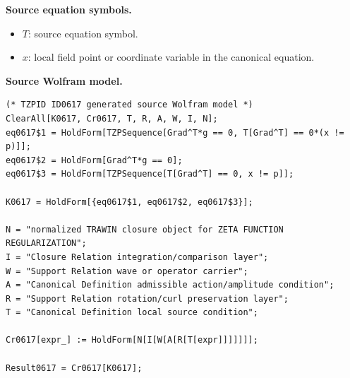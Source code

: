 \begin{minipage}[t]{0.49\linewidth}
\begingroup
\small
\raggedright
\textbf{Source equation symbols.}\par
\begin{itemize}[leftmargin=1.35em,itemsep=1pt,topsep=1pt,parsep=0pt]
    \item $T$: source equation symbol.
    \item $x$: local field point or coordinate variable in the canonical equation.
\end{itemize}
\endgroup
\end{minipage}\hfill
\begin{minipage}[t]{0.47\linewidth}
\begingroup
\scriptsize
\raggedright
\textbf{Source Wolfram model.}\par
\begin{Verbatim}[fontsize=\tiny,breaklines=true,breakanywhere=true]
(* TZPID ID0617 generated source Wolfram model *)
ClearAll[K0617, Cr0617, T, R, A, W, I, N];
eq0617$1 = HoldForm[TZPSequence[Grad^T*g == 0, T[Grad^T] == 0*(x != p)]];
eq0617$2 = HoldForm[Grad^T*g == 0];
eq0617$3 = HoldForm[TZPSequence[T[Grad^T] == 0, x != p]];

K0617 = HoldForm[{eq0617$1, eq0617$2, eq0617$3}];

N = "normalized TRAWIN closure object for ZETA FUNCTION REGULARIZATION";
I = "Closure Relation integration/comparison layer";
W = "Support Relation wave or operator carrier";
A = "Canonical Definition admissible action/amplitude condition";
R = "Support Relation rotation/curl preservation layer";
T = "Canonical Definition local source condition";

Cr0617[expr_] := HoldForm[N[I[W[A[R[T[expr]]]]]]];

Result0617 = Cr0617[K0617];
\end{Verbatim}
\endgroup
\end{minipage}

